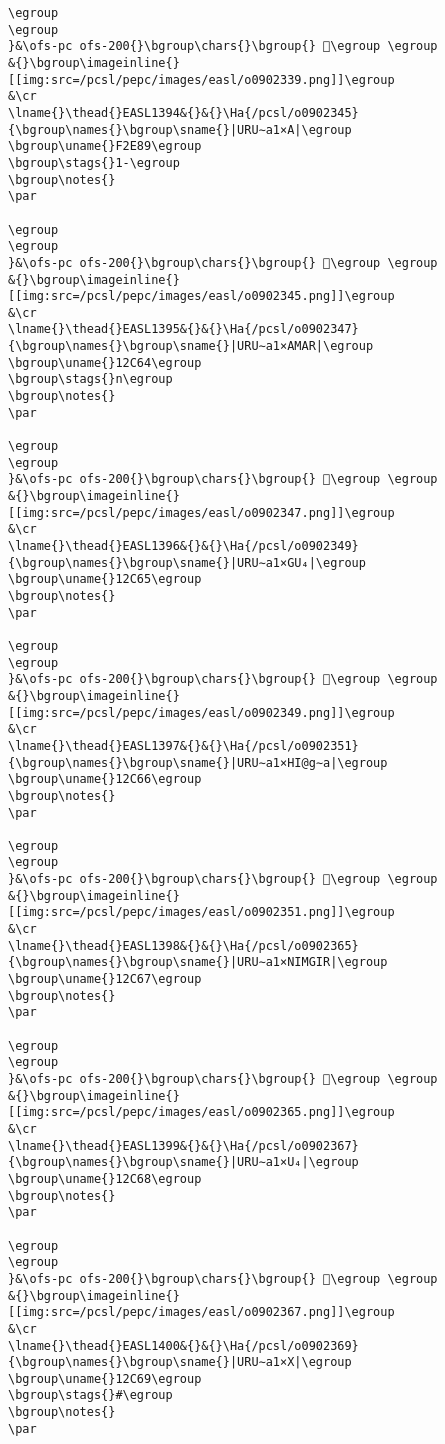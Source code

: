 \begin{verbatim}
\egroup
\egroup
}&\ofs-pc ofs-200{}\bgroup\chars{}\bgroup{} 𒱣\egroup \egroup
&{}\bgroup\imageinline{}[[img:src=/pcsl/pepc/images/easl/o0902339.png]]\egroup
&\cr
\lname{}\thead{}EASL1394&{}&{}\Ha{/pcsl/o0902345}{\bgroup\names{}\bgroup\sname{}|URU∼a1×A|\egroup
\bgroup\uname{}F2E89\egroup
\bgroup\stags{}1-\egroup
\bgroup\notes{}
\par 

\egroup
\egroup
}&\ofs-pc ofs-200{}\bgroup\chars{}\bgroup{} 󲺉\egroup \egroup
&{}\bgroup\imageinline{}[[img:src=/pcsl/pepc/images/easl/o0902345.png]]\egroup
&\cr
\lname{}\thead{}EASL1395&{}&{}\Ha{/pcsl/o0902347}{\bgroup\names{}\bgroup\sname{}|URU∼a1×AMAR|\egroup
\bgroup\uname{}12C64\egroup
\bgroup\stags{}n\egroup
\bgroup\notes{}
\par 

\egroup
\egroup
}&\ofs-pc ofs-200{}\bgroup\chars{}\bgroup{} 𒱤\egroup \egroup
&{}\bgroup\imageinline{}[[img:src=/pcsl/pepc/images/easl/o0902347.png]]\egroup
&\cr
\lname{}\thead{}EASL1396&{}&{}\Ha{/pcsl/o0902349}{\bgroup\names{}\bgroup\sname{}|URU∼a1×GU₄|\egroup
\bgroup\uname{}12C65\egroup
\bgroup\notes{}
\par 

\egroup
\egroup
}&\ofs-pc ofs-200{}\bgroup\chars{}\bgroup{} 𒱥\egroup \egroup
&{}\bgroup\imageinline{}[[img:src=/pcsl/pepc/images/easl/o0902349.png]]\egroup
&\cr
\lname{}\thead{}EASL1397&{}&{}\Ha{/pcsl/o0902351}{\bgroup\names{}\bgroup\sname{}|URU∼a1×HI@g∼a|\egroup
\bgroup\uname{}12C66\egroup
\bgroup\notes{}
\par 

\egroup
\egroup
}&\ofs-pc ofs-200{}\bgroup\chars{}\bgroup{} 𒱦\egroup \egroup
&{}\bgroup\imageinline{}[[img:src=/pcsl/pepc/images/easl/o0902351.png]]\egroup
&\cr
\lname{}\thead{}EASL1398&{}&{}\Ha{/pcsl/o0902365}{\bgroup\names{}\bgroup\sname{}|URU∼a1×NIMGIR|\egroup
\bgroup\uname{}12C67\egroup
\bgroup\notes{}
\par 

\egroup
\egroup
}&\ofs-pc ofs-200{}\bgroup\chars{}\bgroup{} 𒱧\egroup \egroup
&{}\bgroup\imageinline{}[[img:src=/pcsl/pepc/images/easl/o0902365.png]]\egroup
&\cr
\lname{}\thead{}EASL1399&{}&{}\Ha{/pcsl/o0902367}{\bgroup\names{}\bgroup\sname{}|URU∼a1×U₄|\egroup
\bgroup\uname{}12C68\egroup
\bgroup\notes{}
\par 

\egroup
\egroup
}&\ofs-pc ofs-200{}\bgroup\chars{}\bgroup{} 𒱨\egroup \egroup
&{}\bgroup\imageinline{}[[img:src=/pcsl/pepc/images/easl/o0902367.png]]\egroup
&\cr
\lname{}\thead{}EASL1400&{}&{}\Ha{/pcsl/o0902369}{\bgroup\names{}\bgroup\sname{}|URU∼a1×X|\egroup
\bgroup\uname{}12C69\egroup
\bgroup\stags{}#\egroup
\bgroup\notes{}
\par 


\end{verbatim}
